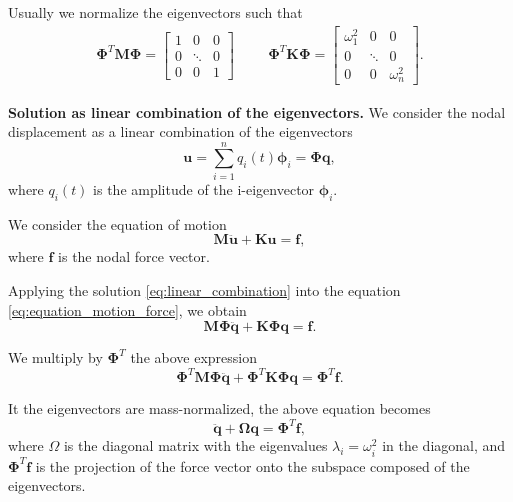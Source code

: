 \documentclass{article}
\begin{document}
Usually we normalize the eigenvectors such that 
\begin{align*}
  \bm{\Phi}^T \bm{M} \bm{\Phi} = \begin{bmatrix}
      1 & 0 & 0\\
      0 & \ddots & 0 \\
      0 & 0 & 1
    \end{bmatrix}
    \hspace{1cm}
    \bm{\Phi}^T \bm{K} \bm{\Phi} = \begin{bmatrix}
      \omega_1^2 & 0 & 0\\
      0 & \ddots & 0 \\
      0 & 0 &  \omega_n^2
    \end{bmatrix}.
  \end{align*}

\noindent \textbf{Solution as linear combination of the eigenvectors.}\newline
\noindent We consider the nodal displacement as a linear combination of the eigenvectors
\begin{equation}
  \bm{u} = \sum_{i=1}^n q_i(t) \bm{\phi}_i = \bm{\Phi}\bm{q},
  \label{eq:linear_combination}
\end{equation}
where $q_i(t)$ is the amplitude of the i-eigenvector $\bm{\phi}_i$.\newline

We consider the equation of motion 
\begin{equation}
  \bm{M}\bm{\ddot{u}} + \bm{K}\bm{u} = \bm{f},
  \label{eq:equation_motion_force}
\end{equation}
where $\bm{f}$ is the nodal force vector. \newline

Applying the solution \ref{eq:linear_combination} into the equation \ref{eq:equation_motion_force}, we obtain
\begin{equation}
  \bm{M}\bm{\Phi}\bm{\ddot{q}} + \bm{K}\bm{\Phi}\bm{q} = \bm{f}.
\end{equation}

We multiply by $\bm{\Phi}^T$ the above expression
\begin{equation}
  \bm{\Phi}^T\bm{M}\bm{\Phi}\bm{\ddot{q}} + \bm{\Phi}^T\bm{K}\bm{\Phi}\bm{q} = \bm{\Phi}^T\bm{f}.
\end{equation}

It the eigenvectors are mass-normalized, the above equation becomes
\begin{equation}
  \bm{\ddot{q}} + \bm{\Omega}\bm{q} = \bm{\Phi}^T\bm{f},
  \label{eq:modal_equation}
\end{equation}
where $\Omega$ is the diagonal matrix with the eigenvalues $\lambda_i = \omega_i^2$ in the diagonal, and $\bm{\Phi}^T\bm{f}$ is the projection of the force vector onto the subspace composed of the eigenvectors. 
\end{document}

